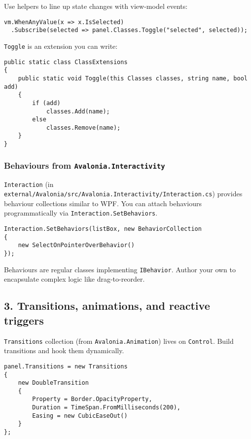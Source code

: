 Use helpers to line up state changes with view-model events:

\begin{lstlisting}
vm.WhenAnyValue(x => x.IsSelected)
  .Subscribe(selected => panel.Classes.Toggle("selected", selected));
\end{lstlisting}

\passthrough{\lstinline!Toggle!} is an extension you can write:

\begin{lstlisting}
public static class ClassExtensions
{
    public static void Toggle(this Classes classes, string name, bool add)
    {
        if (add)
            classes.Add(name);
        else
            classes.Remove(name);
    }
}
\end{lstlisting}

\subsubsection{\texorpdfstring{Behaviours from
\texttt{Avalonia.Interactivity}}{Behaviours from Avalonia.Interactivity}}\label{behaviours-from-avalonia.interactivity}

\passthrough{\lstinline!Interaction!} (in
\passthrough{\lstinline!external/Avalonia/src/Avalonia.Interactivity/Interaction.cs!})
provides behaviour collections similar to WPF. You can attach behaviours
programmatically via \passthrough{\lstinline!Interaction.SetBehaviors!}.

\begin{lstlisting}
Interaction.SetBehaviors(listBox, new BehaviorCollection
{
    new SelectOnPointerOverBehavior()
});
\end{lstlisting}

Behaviours are regular classes implementing
\passthrough{\lstinline!IBehavior!}. Author your own to encapsulate
complex logic like drag-to-reorder.

\subsection{3. Transitions, animations, and reactive
triggers}\label{transitions-animations-and-reactive-triggers}

\passthrough{\lstinline!Transitions!} collection (from
\passthrough{\lstinline!Avalonia.Animation!}) lives on
\passthrough{\lstinline!Control!}. Build transitions and hook them
dynamically.

\begin{lstlisting}
panel.Transitions = new Transitions
{
    new DoubleTransition
    {
        Property = Border.OpacityProperty,
        Duration = TimeSpan.FromMilliseconds(200),
        Easing = new CubicEaseOut()
    }
};
\end{lstlisting}

